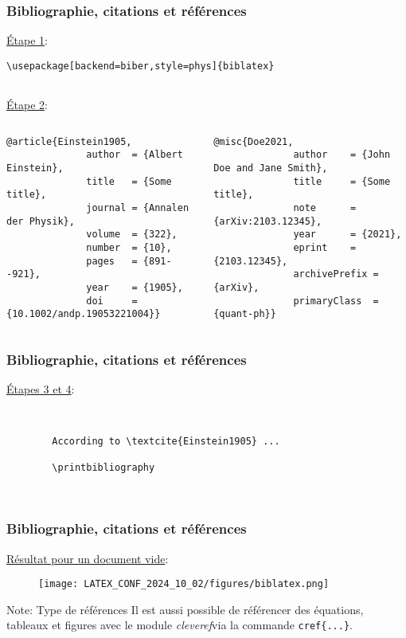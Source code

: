 \begin{frame}[fragile]
    \frametitle{Bibliographie, citations et références}
    \underline{Étape 1}:
    \vfill
    \begin{lstlisting}[xleftmargin=-1.5cm, basicstyle=\small]
        \usepackage[backend=biber,style=phys]{biblatex}
        
    \end{lstlisting}
    \vfill
    \pause
    \underline{Étape 2}:
    \begin{columns}
        \begin{lstlisting}[xleftmargin=-1cm, basicstyle=\footnotesize]
            @article{Einstein1905,
              author  = {Albert Einstein}, 
              title   = {Some title},
              journal = {Annalen der Physik},
              volume  = {322},
              number  = {10},
              pages   = {891--921},
              year    = {1905},
              doi     = {10.1002/andp.19053221004}}
        \end{lstlisting}
        \begin{lstlisting}[xleftmargin=-1cm, basicstyle=\footnotesize]
            @misc{Doe2021,
              author    = {John Doe and Jane Smith},
              title     = {Some title},
              note      = {arXiv:2103.12345},
              year      = {2021},
              eprint    = {2103.12345},
              archivePrefix = {arXiv},
              primaryClass  = {quant-ph}}
        \end{lstlisting}
    \end{columns}
\end{frame}

\begin{frame}[fragile]
    \frametitle{Bibliographie, citations et références}
    \underline{Étapes 3 et 4}:
    \vfill
    \begin{lstlisting}[xleftmargin=-1cm, basicstyle=\small]
       

        According to \textcite{Einstein1905} ...

        \printbibliography
        
        
    \end{lstlisting}
\end{frame}

\begin{frame}[fragile]
    \frametitle{Bibliographie, citations et références}
    \underline{Résultat pour un document vide}:
    \vfill
    \begin{figure}
        \centering
        \texttt{[image: LATEX\_CONF\_2024\_10\_02/figures/biblatex.png]}
        \label{fig: biblatex}
    \end{figure}
    \vfill\pause
    \begin{noteblock}{Note: Type de références}
        Il est aussi possible de référencer des équations, tableaux et figures avec le module \textcolor{hard_green}{\textit{cleveref}}\footnotemark via la commande \texttt{cref\{...\}}.
    \end{noteblock}
\end{frame}